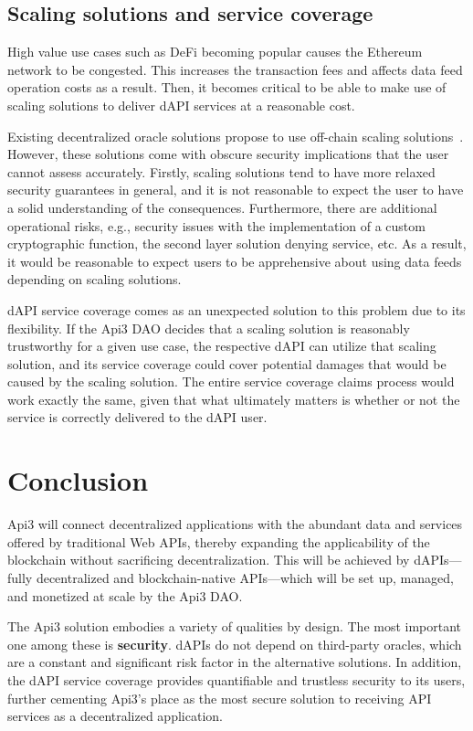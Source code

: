 \documentclass[11pt]{article}
\begin{document}
\subsection{Scaling solutions and service coverage}
\label{sec:scaling-solutions-and-service-coverage}

High value use cases such as DeFi becoming popular causes the Ethereum network to be congested.
This increases the transaction fees and affects data feed operation costs as a result.
Then, it becomes critical to be able to make use of scaling solutions to deliver dAPI services at a reasonable cost.

Existing decentralized oracle solutions propose to use off-chain scaling solutions~\cite{ellis:2017,band}.
However, these solutions come with obscure security implications that the user cannot assess accurately.
Firstly, scaling solutions tend to have more relaxed security guarantees in general, and it is not reasonable to expect the user to have a solid understanding of the consequences.
Furthermore, there are additional operational risks, e.g., security issues with the implementation of a custom cryptographic function, the second layer solution denying service, etc.
As a result, it would be reasonable to expect users to be apprehensive about using data feeds depending on scaling solutions.

dAPI service coverage comes as an unexpected solution to this problem due to its flexibility.
If the Api3 DAO decides that a scaling solution is reasonably trustworthy for a given use case, the respective dAPI can utilize that scaling solution, and its service coverage could cover potential damages that would be caused by the scaling solution.
The entire service coverage claims process would work exactly the same, given that what ultimately matters is whether or not the service is correctly delivered to the dAPI user.

\section{Conclusion}
\label{sec:conclusion}

Api3 will connect decentralized applications with the abundant data and services offered by traditional Web APIs, thereby expanding the applicability of the blockchain without sacrificing decentralization.
This will be achieved by dAPIs---fully decentralized and blockchain-native APIs---which will be set up, managed, and monetized at scale by the Api3 DAO.

The Api3 solution embodies a variety of qualities by design.
The most important one among these is \textbf{security}. dAPIs do not depend on third-party oracles, which are a constant and significant risk factor in the alternative solutions.
In addition, the dAPI service coverage provides quantifiable and trustless security to its users, further cementing Api3’s place as the most secure solution to receiving API services as a decentralized application.
\end{document}
